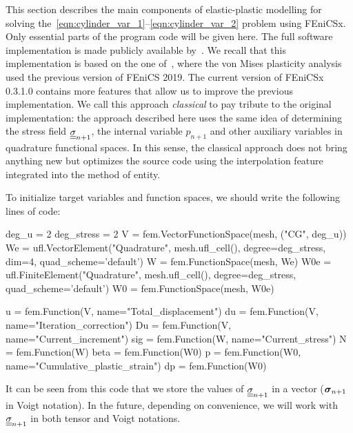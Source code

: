 \documentclass[12pt]{article}
\begin{document}
This section describes the main components of elastic-plastic modelling for solving the~\eqref{eqn:cylinder_var_1}--\eqref{eqn:cylinder_var_2} problem using FEniCSx. Only essential parts of the program code will be given here. The full software implementation is made publicly available by~\parencite{convex-plasticity}. We recall that this implementation is based on the one of~\textcite{bleyer2018numericaltours}, where the von Mises plasticity analysis used the previous version of FEniCS 2019. The current version of FEniCSx 0.3.1.0 contains more features that allow us to improve the previous implementation. We call this approach \textit{classical} to pay tribute to the original implementation: the approach described here uses the same idea of determining the stress field $\underline{\underline{\sigma}}_{n+1}$, the internal variable $p_{n+1}$ and other auxiliary variables in quadrature functional spaces. In this sense, the classical approach does not bring anything new but optimizes the source code using the interpolation feature integrated into the  method of  entity.

To initialize target variables and function spaces, we should write the following lines of code:

\begin{pythoncode}
    deg_u = 2
    deg_stress = 2
    V = fem.VectorFunctionSpace(mesh, ("CG", deg_u))
    We = ufl.VectorElement("Quadrature", mesh.ufl_cell(), degree=deg_stress, dim=4, quad_scheme='default')
    W = fem.FunctionSpace(mesh, We)
    W0e = ufl.FiniteElement("Quadrature", mesh.ufl_cell(), degree=deg_stress, quad_scheme='default')
    W0 = fem.FunctionSpace(mesh, W0e)

    u = fem.Function(V, name="Total_displacement")
    du = fem.Function(V, name="Iteration_correction")
    Du = fem.Function(V, name="Current_increment")
    sig = fem.Function(W, name="Current_stress")
    N = fem.Function(W)
    beta = fem.Function(W0)
    p = fem.Function(W0, name="Cumulative_plastic_strain")
    dp = fem.Function(W0)
\end{pythoncode}

It can be seen from this code that we store the values of $\underline{\underline{\sigma}}_{n+1}$ in a vector  ($\mbox{\boldmath $\sigma$}_{n+1}$ in Voigt notation). In the future, depending on convenience, we will work with $\underline{\underline{\sigma}}_{n+1}$ in both tensor and Voigt notations.
\end{document}
